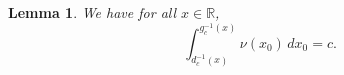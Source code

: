 \documentclass[a4paper, 11pt]{article}
\newtheorem{lemma}{Lemma}
\theoremstyle{definition}
\begin{document}
{{\begin{lemma}\label{l : second step staircase}
We have for all $x\in \mathbb{R}$,
\begin{equation*}
 \int_{d_c^{-1}(x)}^{g_c^{-1}(x)}\nu(x_0) \, dx_0 = c.
\end{equation*}
\end{lemma}


%
%
%

}}
\end{document}

